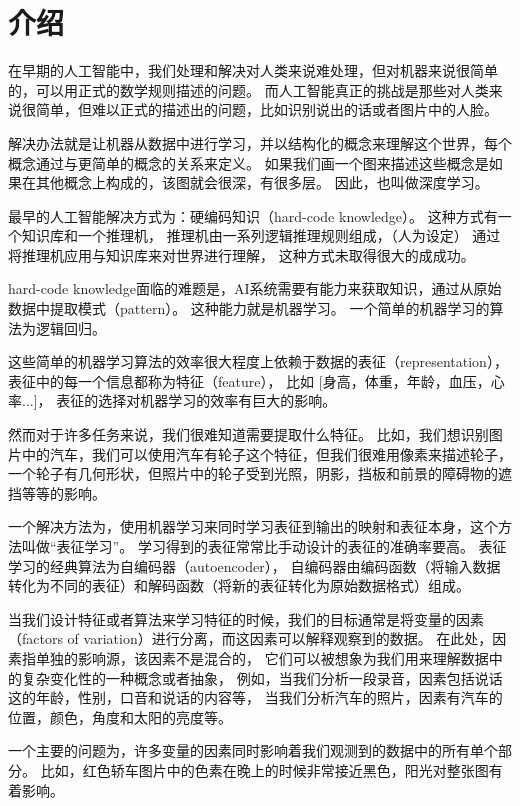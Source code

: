 
\chapter{介绍}

在早期的人工智能中，我们处理和解决对人类来说难处理，但对机器来说很简单的，可以用正式的数学规则描述的问题。
而人工智能真正的挑战是那些对人类来说很简单，但难以正式的描述出的问题，比如识别说出的话或者图片中的人脸。

解决办法就是让机器从数据中进行学习，并以结构化的概念来理解这个世界，每个概念通过与更简单的概念的关系来定义。
如果我们画一个图来描述这些概念是如果在其他概念上构成的，该图就会很深，有很多层。
因此，也叫做深度学习。

最早的人工智能解决方式为：硬编码知识（hard-code knowledge）。
这种方式有一个知识库和一个推理机，
推理机由一系列逻辑推理规则组成，（人为设定）
通过将推理机应用与知识库来对世界进行理解，
这种方式未取得很大的成成功。



hard-code knowledge面临的难题是，AI系统需要有能力来获取知识，通过从原始数据中提取模式（pattern）。
这种能力就是机器学习。
一个简单的机器学习的算法为逻辑回归。


这些简单的机器学习算法的效率很大程度上依赖于数据的表征（representation），
表征中的每一个信息都称为特征（feature），
比如 [身高，体重，年龄，血压，心率...]，
表征的选择对机器学习的效率有巨大的影响。

然而对于许多任务来说，我们很难知道需要提取什么特征。
比如，我们想识别图片中的汽车，我们可以使用汽车有轮子这个特征，但我们很难用像素来描述轮子，一个轮子有几何形状，但照片中的轮子受到光照，阴影，挡板和前景的障碍物的遮挡等等的影响。


一个解决方法为，使用机器学习来同时学习表征到输出的映射和表征本身，这个方法叫做“表征学习”。
学习得到的表征常常比手动设计的表征的准确率要高。
表征学习的经典算法为自编码器（autoencoder），
自编码器由编码函数（将输入数据转化为不同的表征）和解码函数（将新的表征转化为原始数据格式）组成。


当我们设计特征或者算法来学习特征的时候，我们的目标通常是将变量的因素（factors of variation）进行分离，而这因素可以解释观察到的数据。
在此处，因素指单独的影响源，该因素不是混合的，
它们可以被想象为我们用来理解数据中的复杂变化性的一种概念或者抽象，
例如，当我们分析一段录音，因素包括说话这的年龄，性别，口音和说话的内容等，
当我们分析汽车的照片，因素有汽车的位置，颜色，角度和太阳的亮度等。

一个主要的问题为，许多变量的因素同时影响着我们观测到的数据中的所有单个部分。
比如，红色轿车图片中的色素在晚上的时候非常接近黑色，阳光对整张图有着影响。

